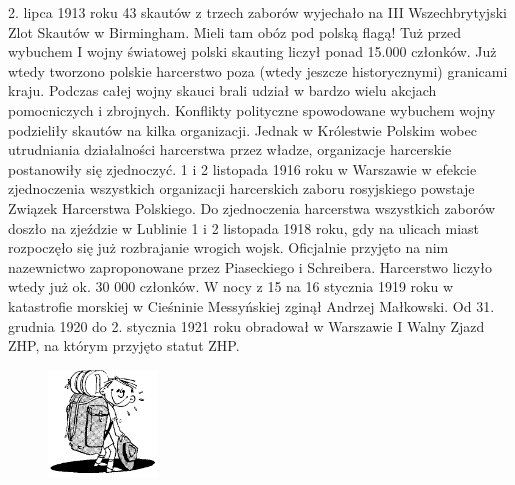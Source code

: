 2. lipca 1913 roku 43 skautów z trzech zaborów wyjechało na III Wszechbrytyjski Zlot Skautów w Birmingham. Mieli tam obóz pod polską flagą! Tuż przed wybuchem I wojny światowej polski skauting liczył ponad 15.000 członków. Już wtedy tworzono polskie harcerstwo poza (wtedy jeszcze historycznymi) granicami kraju. Podczas całej wojny skauci brali udział w bardzo wielu akcjach pomocniczych i zbrojnych. Konflikty polityczne spowodowane wybuchem wojny podzieliły skautów na kilka organizacji. Jednak w Królestwie Polskim wobec utrudniania działalności harcerstwa przez władze, organizacje harcerskie postanowiły się zjednoczyć. 1 i 2 listopada 1916 roku w Warszawie w efekcie zjednoczenia wszystkich organizacji harcerskich zaboru rosyjskiego powstaje Związek Harcerstwa Polskiego. Do zjednoczenia harcerstwa wszystkich zaborów doszło na zjeździe w Lublinie 1 i 2 listopada 1918 roku, gdy na ulicach miast rozpoczęło się już rozbrajanie wrogich wojsk. Oficjalnie przyjęto na nim nazewnictwo zaproponowane przez Piaseckiego i Schreibera. Harcerstwo liczyło wtedy już ok. 30 000 członków. W nocy z 15 na 16 stycznia 1919 roku w katastrofie morskiej w Cieśninie Messyńskiej zginął Andrzej Małkowski. Od 31. grudnia 1920 do 2. stycznia 1921 roku obradował w Warszawie I Walny Zjazd ZHP, na którym przyjęto statut ZHP. 
\begin{figure}
  \begin{center}
    \includegraphics[width=2.9cm]{grafiki/lipca.png}
  \end{center}
\end{figure}
